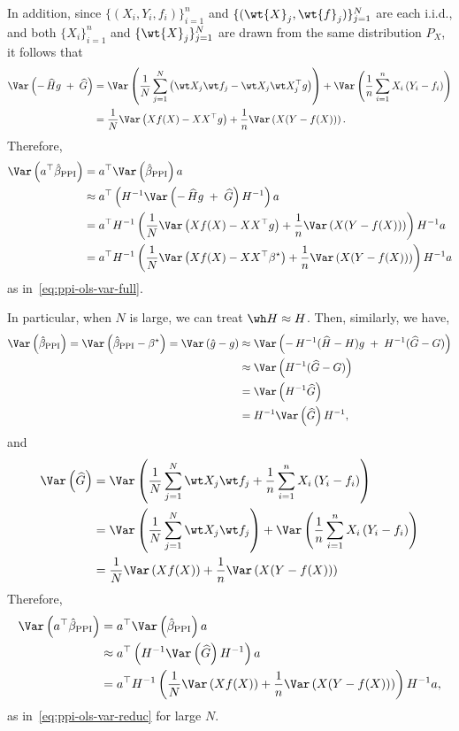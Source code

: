 \noindent
In addition, since $\{(X_i, Y_i, f_i)\}_{i=1}^n$ and $\{(\wt{X}_j, \wt{f}_j)\}_{j=1}^N$ are each i.i.d., and both $\{X_i\}_{i=1}^n$ and $\{\wt{X}_j\}_{j=1}^N$ are drawn from the same distribution $P_X$, it follows that 
\begin{align*}
\Var\left(-\,\widehat{H}g\;+\;\widehat{G}\right)&=\Var\left(\frac{1}{N}\sum^N_{j=1}\left(\wt X_j\wt f_j-\wt X_j\wt X_j^\top g\right)\right)+
\Var\left(\frac{1}{n}\sum^n_{i=1}X_i\left(Y_i-f_i\right)
\right)\\
&=\frac{1}{N}\Var\left(Xf(X)-XX^\top g \right)+\frac{1}{n}\Var\left(X(Y-f(X)) \right).
\end{align*}
Therefore, \begin{align*}
    \Var\left(a^\top\hat{\beta}_{\mathrm{PPI}}\right)
    &=a^\top\Var\left(\hat{\beta}_{\mathrm{PPI}}\right)a\\
    &\approx a^\top\left(H^{-1}\Var\left(-\,\widehat{H}g\;+\;\widehat{G}\right)H^{-1}\right)a\\
    &=a^\top H^{-1} \left(\frac{1}{N}\Var\left(Xf(X)-XX^\top g \right)+\frac{1}{n}\Var\left(X(Y-f(X)) \right) \right)H^{-1}a\\
    &= a^\top H^{-1} \left(\frac{1}{N}\Var\left(Xf(X)-XX^\top \beta^\star \right)+\frac{1}{n}\Var\left(X(Y-f(X)) \right) \right)H^{-1}a
\end{align*}as in~\eqref{eq:ppi-ols-var-full}.

\noindent
In particular, when $N$ is large, we can treat $\wh H\approx H$. Then, similarly, we have, \begin{align*}
    \Var\left(\hat{\beta}_{\mathrm{PPI}}\right)
    =\Var\left(\hat{\beta}_{\mathrm{PPI}}-\beta^\star\right)
    =\Var\left(\hat{g}-g\right)
    &\approx\Var\left(-\,H^{-1}(\widehat{H} - H)g\;+\;H^{-1}(\widehat{G} - G)\right)\\
    &\approx \Var\left(H^{-1}(\widehat{G} - G)\right)\\
    &=\Var\left(H^{-1}\widehat{G}\right)\\
    &=H^{-1}\Var\left(\widehat{G}\right)H^{-1},
\end{align*}and
\begin{align*}
    \Var\left(\widehat{G}\right)&
    =\Var\left(\frac{1}{N}\sum^N_{j=1}\wt X_j\wt f_j+\frac{1}{n}\sum^n_{i=1}X_i\left(Y_i-f_i\right)
    \right)\\
    &=\Var\left(\frac{1}{N}\sum^N_{j=1}\wt X_j\wt f_j\right)+
    \Var\left(\frac{1}{n}\sum^n_{i=1}X_i\left(Y_i-f_i\right)
    \right)\\
    &=\frac{1}{N}\Var\left(Xf(X) \right)+\frac{1}{n}\Var\left(X(Y-f(X))\right)
\end{align*}
Therefore,
\begin{align*}
    \Var\left(a^\top\hat{\beta}_{\mathrm{PPI}}\right)
    &=a^\top\Var\left(\hat{\beta}_{\mathrm{PPI}}\right)a\\
    &\approx a^\top\left(H^{-1}\Var\left(\widehat{G}\right)H^{-1}\right)a\\
    &=a^\top H^{-1} \left(\frac{1}{N}\Var\left(Xf(X) \right)+\frac{1}{n}\Var\left(X(Y-f(X)) \right) \right)H^{-1}a,
\end{align*}as in~\eqref{eq:ppi-ols-var-reduc} for large $N$.

